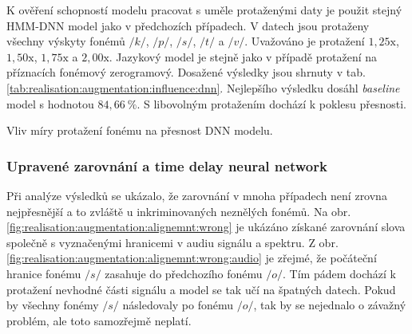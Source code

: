 K ověření schopností modelu pracovat s uměle protaženými daty je použit stejný HMM-DNN model jako v předchozích případech.
V datech jsou protaženy všechny výskyty fonémů $/k/$, $/p/$, $/s/$, $/t/$ a $/v/$. Uvažováno je protažení $1,25\mathrm{x}$, $1,50\mathrm{x}$, $1,75\mathrm{x}$ a $2,00\mathrm{x}$. Jazykový model je stejně jako v případě protažení na příznacích fonémový zerogramový.
Dosažené výsledky jsou shrnuty v tab. \ref{tab:realisation:augmentation:influence:dnn}.
Nejlepšího výsledku dosáhl \textit{baseline} model s hodnotou $84,66\ \%$.
S libovolným protažením dochází k poklesu přesnosti.

\begin{table}[htpb]
  \centering
  \def\arraystretch{1.5}
  \caption{Vliv míry protažení fonému na přesnost DNN modelu.}
  \label{tab:realisation:augmentation:influence:dnn}
\end{table}

\subsubsection{Upravené zarovnání a time delay neural network}

Při analýze výsledků se ukázalo, že zarovnání v mnoha případech není zrovna nejpřesnější a to zvláště u inkriminovaných neznělých fonémů.
Na obr. \ref{fig:realisation:augmentation:alignemnt:wrong} je ukázáno získané zarovnání slova  společně s vyznačenými hranicemi v audiu signálu a spektru.
Z obr. \ref{fig:realisation:augmentation:alignemnt:wrong:audio} je zřejmé, že počáteční hranice fonému $/s/$ zasahuje do předchozího fonému $/o/$.
Tím pádem dochází k protažení nevhodné části signálu a model se tak učí na špatných datech.
Pokud by všechny fonémy $/s/$ následovaly po fonému $/o/$, tak by se nejednalo o závažný problém, ale toto samozřejmě neplatí.

